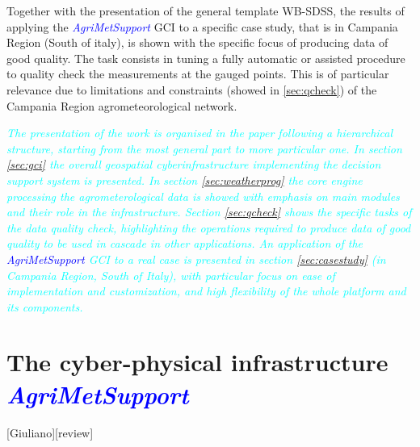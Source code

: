 \documentclass[authoryear,preprint,review,12pt]{elsarticle}
\newcommand{\update}[1]{\emph{\textcolor{blue}{#1}}}
\newcommand{\review}[1]{\emph{\textcolor{cyan}{#1}}}
\newcommand{\gci}{\update{AgriMetSupport}\xspace}
\begin{document}
Together with the presentation of the general template WB-SDSS, the results of applying the \gci GCI to a specific case study, that is in Campania Region (South of italy), is shown with the specific focus of producing data of good quality.
The task consists in tuning a fully automatic or assisted procedure to quality check the measurements at the gauged points.
This is of particular relevance due to limitations and constraints (showed in \cref{sec:qcheck}) of the Campania Region agrometeorological network.

\review{The presentation of the work is organised in the paper following a hierarchical structure, starting from the most general part to more particular one. In section \ref{sec:gci} the overall geospatial cyberinfrastructure implementing the decision support system is presented. In section \ref{sec:weatherprog} the core engine processing the agrometerological data is showed with emphasis on main modules and their role in the infrastructure. Section \ref{sec:qcheck} shows the specific tasks of the data quality check, highlighting the operations required to produce data of good quality to be used in cascade in other applications. An application of the \gci GCI to a real case is presented in section \ref{sec:casestudy} (in Campania Region, South of Italy),  with particular focus on ease of implementation and customization, and high flexibility of the whole platform and its components. }

\section{The cyber-physical infrastructure \gci}[Giuliano][review] \label{sec:gci}
\end{document}
